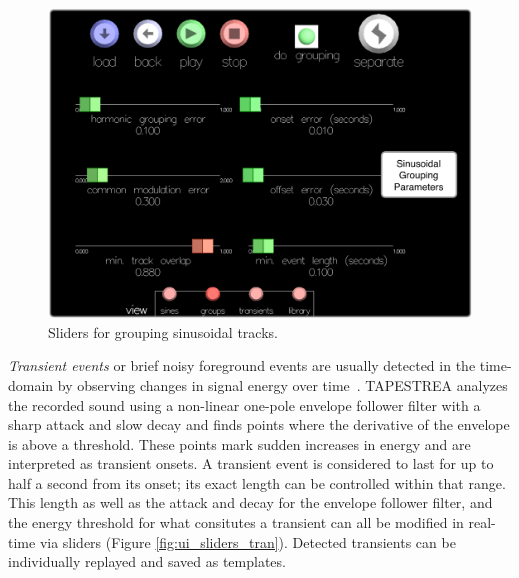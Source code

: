 \documentclass[10pt,letterpaper]{article}
\begin{document}
\begin{figure}[h]
  \begin{center}
    \includegraphics[width=.95\columnwidth]{ui_sliders2.pdf}
    \caption{Sliders for grouping sinusoidal tracks.} 
    \label{fig:ui_sliders_group}
  \end{center}
\end{figure}

\textit{Transient events} or brief noisy foreground events are usually
detected in the time-domain by observing changes in signal energy over
time~. TAPESTREA analyzes the recorded
sound using a non-linear one-pole envelope follower filter with a sharp
attack and slow decay and finds points where the derivative of the
envelope is above a threshold. These points mark sudden increases in
energy and are interpreted as transient onsets. A transient event is
considered to last for up to half a second from its onset; its exact
length can be controlled within that range. This length as well as the attack and
decay for the envelope follower filter, and the energy threshold for what
consitutes a transient can all be modified in real-time via sliders (Figure \ref{fig:ui_sliders_tran}). Detected transients can be
individually replayed and saved as templates. 
\end{document}
